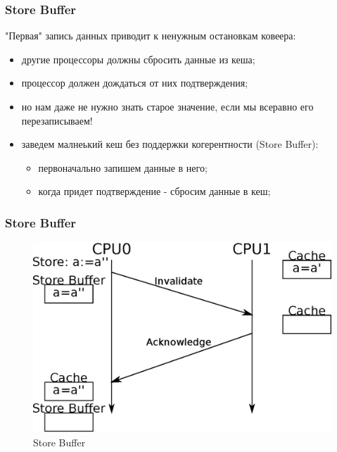 \begin{frame}
\frametitle{Store Buffer}

"Первая" запись данных приводит к ненужным остановкам ковеера:
\begin{itemize}
  \item другие процессоры должны сбросить данные из кеша;
  \item процессор должен дождаться от них подтверждения;
  \item<2-> но нам даже не нужно знать старое значение, если мы всеравно его
        перезаписываем!
  \item<3-> заведем малнеький кеш без поддержки когерентности (Store Buffer):
        \begin{itemize}
          \item первоначально запишем данные в него;
          \item когда придет подтверждение - сбросим данные в кеш;
        \end{itemize}
\end{itemize}
\end{frame}

\begin{frame}
\frametitle{Store Buffer}

\begin{figure}
  \centering\includegraphics[width=.8\linewidth]{cache-store-buffer}
  \caption{Store Buffer}
\end{figure}
\end{frame}

